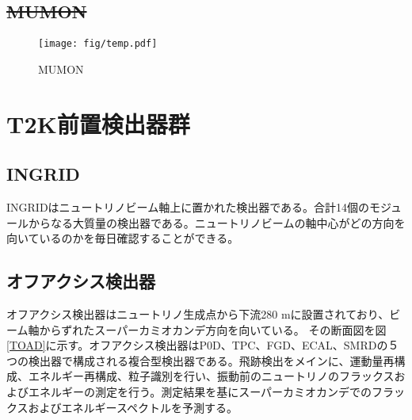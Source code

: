 \documentclass[11pt]{ltjsreport}
\newcommand{\figref}[1]{図\ref{#1}}
\begin{document}
%



\subsection{\sout{MUMON}}

\begin{figure}[htb]
\begin{center}
\texttt{[image: fig/temp.pdf]}
\caption[MUMON]{MUMON}
\label{MUMON}
\end{center}
\end{figure}

\fi %

\section{T2K前置検出器群}
\subsection{INGRID}
INGRIDはニュートリノビーム軸上に置かれた検出器である。合計14個のモジュールからなる大質量の検出器である。ニュートリノビームの軸中心がどの方向を向いているのかを毎日確認することができる。


\subsection{オフアクシス検出器}
オフアクシス検出器はニュートリノ生成点から下流280 mに設置されており、ビーム軸からずれたスーパーカミオカンデ方向を向いている。
その断面図を\figref{TOAD}に示す。オフアクシス検出器はP0D、TPC、FGD、ECAL、SMRDの５つの検出器で構成される複合型検出器である。飛跡検出をメインに、運動量再構成、エネルギー再構成、粒子識別を行い、振動前のニュートリノのフラックスおよびエネルギーの測定を行う。測定結果を基にスーパーカミオカンデでのフラックスおよびエネルギースペクトルを予測する。
\end{document}
